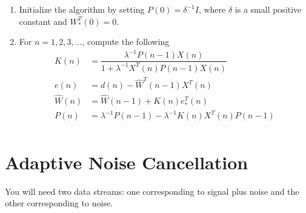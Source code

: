 \documentclass[journal,12pt,twocolumn]{IEEEtran}
\begin{document}
\begin{enumerate}
\item Initialize the algorithm by setting $P(0) = \delta ^{-1} I$, where $\delta$ is a small positive constant and
$W_*^{T}(0)=0$. 
\item For $n=1,2,3, \dots$,
 compute the following
 \begin{align*}
 K(n) &= \dfrac{\lambda ^{-1}P(n-1)X(n)}{1+ \lambda ^{-1}X^{T}(n)P(n-1)X(n)}\\
e(n) &= d(n)-\hat W^{T}(n-1)X^{T}(n)\\
\hat W(n)&=\hat W(n-1)+K(n)e_{*}^{T}(n)\\
P(n)&=\lambda ^{-1}P(n-1) - \lambda ^{-1} K(n)X^{T}(n)P(n-1)\\
\end{align*}
\end{enumerate}
\section{Adaptive Noise Cancellation}
You will need two data streams: one corresponding to signal plus noise and the other corresponding to noise.\\
\end{document}
